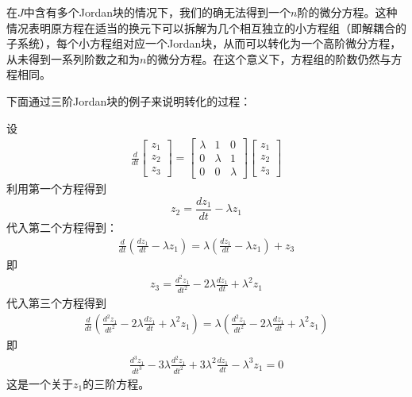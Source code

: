 \documentclass{ctexbook}
\begin{document}
在$J$中含有多个Jordan块的情况下，我们的确无法得到一个$n$阶的微分方程。这种情况表明原方程在适当的换元下可以拆解为几个相互独立的小方程组（即解耦合的子系统），每个小方程组对应一个Jordan块，从而可以转化为一个高阶微分方程，从未得到一系列阶数之和为$n$的微分方程。在这个意义下，方程组的阶数仍然与方程相同。

下面通过三阶Jordan块的例子来说明转化的过程：

\begin{example}
    设\begin{align*}
            \frac{d}{dt}\begin{bmatrix}
                z_1\\
                z_2\\
                z_3
            \end{bmatrix}=\begin{bmatrix}
            \lambda & 1 & 0\\
            0 & \lambda & 1\\
            0 & 0 & \lambda
            \end{bmatrix}\begin{bmatrix}
                z_1\\
                z_2\\
                z_3
            \end{bmatrix}
        \end{align*}
        利用第一个方程得到
        $$z_2=\frac{dz_1}{dt}-\lambda z_1$$
        代入第二个方程得到：\begin{align*}
            \frac{d}{dt}\left(\frac{dz_1}{dt}-\lambda z_1\right)=\lambda\left(\frac{dz_1}{dt}-\lambda z_1\right)+z_3
        \end{align*}
        即\begin{align*}
            z_3=\frac{d^2 z_1}{dt^2}-2\lambda\frac{dz_1}{dt}+\lambda^2 z_1
        \end{align*}
        代入第三个方程得到\begin{align*}
            \frac{d}{dt}\left(\frac{d^2 z_1}{dt^2}-2\lambda\frac{dz_1}{dt}+\lambda^2 z_1\right)=\lambda\left(\frac{d^2 z_1}{dt^2}-2\lambda\frac{dz_1}{dt}+\lambda^2 z_1\right)
        \end{align*}
        即\begin{align*}
            \frac{d^3 z_1}{dt^3}-3\lambda\frac{d^2 z_1}{dt^2}+3\lambda^2\frac{dz_1}{dt}-\lambda^3 z_1=0
        \end{align*}
        这是一个关于$z_1$的三阶方程。
\end{example}
\end{document}
